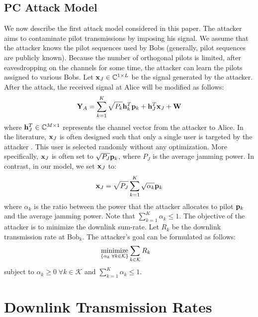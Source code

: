 \documentclass[draftclsnofoot, 12pt, onecolumn, journal]{IEEEtran}
\newcommand{\hv}{{\bf h}}
\newcommand{\pv}{{\bf p}}
\newcommand{\xv}{{\bf x}}
\newcommand{\Wm}{{\bf W}}
\newcommand{\Ym}{{\bf Y}}
\begin{document}
\subsection{PC Attack Model}
\label{subsec:attackmodel}
We now describe the first attack model considered in this paper.
The attacker aims to contaminate pilot transmissions by imposing his signal.
We assume that the attacker knows the pilot sequences used by Bobs (generally, pilot sequences are publicly known).
Because the number of orthogonal pilots is limited, after eavesdropping on the channels for some time, the attacker can learn the pilots assigned to various Bobs.
Let $\xv_J \in \mathbb{C}^{1 \times L}$ be the signal generated by the attacker.
After the attack, the received signal at Alice will be modified as follows:
%
\begin{align}
\Ym_A = \sum_{k = 1}^{K} \sqrt{P_k} \hv_k^T \pv_k + \hv_J^T \xv_J + \Wm
\end{align}
%
where $\hv_J^T \in \mathbb{C}^{M \times 1}$ represents the channel vector from the attacker to Alice.
In the literature, $\xv_J$ is often designed such that only a single user is targeted by the attacker \cite{Zhou2012, Basciftci}.
This user is selected randomly without any optimization.
More specifically, $\xv_J$ is often set to $\sqrt{P_J} \pv_k$, where $P_J$ is the average jamming power.
In contrast, in our model, we set $\xv_J$ to:
%
\begin{align}
\xv_J = \sqrt{P_J} \sum_{k = 1}^{K} \sqrt{\alpha_k} \pv_k
\label{eq:attack1}
\end{align}
% 
where $\alpha_k$ is the ratio between the power that the attacker allocates to pilot $\pv_k$ and the average jamming power.
Note that $\sum_{k = 1}^{K} \alpha_k \leq 1$.
The objective of the attacker is to minimize the downlink sum-rate.
Let $R_k$ be the downlink transmission rate at Bob$_k$.
The attacker's goal can be formulated as follows:
%
\begin{align}
\label{prob:1}
\underset{ 
\begin{subarray} \\
\{ \alpha_k \; \forall k \in \mathcal{K} \} \end{subarray} }{\text{minimize}} 
& \sum_{k \in \mathcal{K}} R_{k}
\end{align}
%
subject to $\alpha_k \geq 0   \; \forall k \in \mathcal{K}$ and $\sum_{k = 1}^K \alpha_k \leq 1$.

\section{Downlink Transmission Rates}
\label{sec:down_trans_rates}
\end{document}
